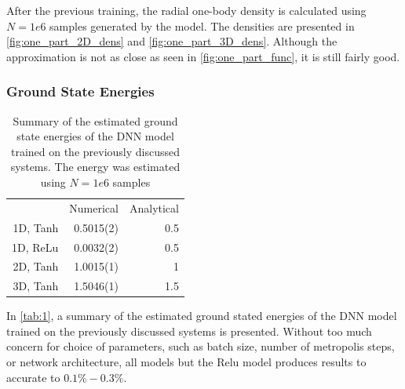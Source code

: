 After the previous training, the radial one-body density is calculated using $N=1e6$ samples generated by the model. The densities are presented in \autoref{fig:one_part_2D_dens} and \autoref{fig:one_part_3D_dens}. Although the approximation is not as close as seen in \autoref{fig:one_part_func}, it is still fairly good. 

\subsubsection{Ground State Energies}

\begin{table}[ht]
	\begin{tabular}{r|rr}
		\toprule
		           & Numerical & Analytical \\
		1D, Tanh   & 0.5015(2) &   0.5      \\
		1D, ReLu   & 0.0032(2) &   0.5      \\
		2D, Tanh   & 1.0015(1) &   1        \\
		3D, Tanh   & 1.5046(1) &   1.5      \\
		\bottomrule
	\end{tabular}
	\caption{Summary of the estimated ground state energies of the DNN model trained on the previously discussed systems. The energy was estimated using $N=1e6$ samples}
	\label{tab:1}
\end{table}

In \autoref{tab:1}, a summary of the estimated ground stated energies of the DNN model trained on the previously discussed systems is presented. Without too much concern for choice of parameters, such as batch size, number of metropolis steps, or network architecture, all models but the Relu model produces results to accurate to $0.1\%-0.3\%$.


